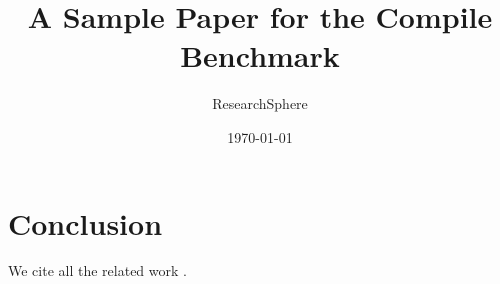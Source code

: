 \documentclass[11pt]{article}
\title{A Sample Paper for the Compile Benchmark}
\author{ResearchSphere}
\date{\today}
\begin{document}
\maketitle
\begin{abstract}
\lipsum[1]
\end{abstract}
\tableofcontents



\section{Conclusion}
\lipsum[20-21]
We cite all the related work \cite{ref1,ref2,ref3,ref4,ref5,ref6,ref7,ref8,ref9,ref10,ref11,ref12,ref13,ref14,ref15,ref16,ref17,ref18,ref19,ref20}.


\end{document}
